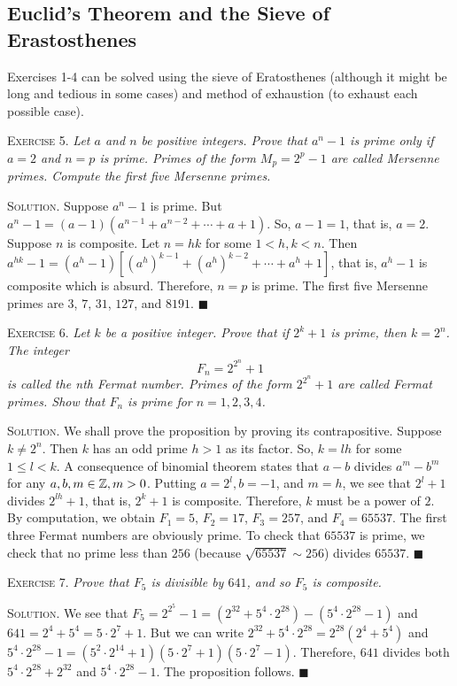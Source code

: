 \documentclass[11pt, leqno]{article}
\newcommand{\done}{\ensuremath{\blacksquare}}
\begin{document}
\subsection{Euclid's Theorem and the Sieve of Erastosthenes}

Exercises 1-4 can be solved using the sieve of Eratosthenes (although it might be long and tedious in some cases) and method of exhaustion (to exhaust each possible case).

\textsc{Exercise 5}. \emph{Let $a$ and $n$ be positive integers. Prove that $a^n-1$ is prime only if $a=2$ and $n=p$ is prime. Primes of the form $M_p = 2^p - 1$ are called Mersenne primes. Compute the first five Mersenne primes.}

\textsc{Solution}. Suppose $a^n-1$ is prime. But $a^n-1 = (a-1)(a^{n-1} + a^{n-2} + \cdots + a + 1)$. So, $a-1 = 1$, that is, $a=2$. Suppose $n$ is composite. Let $n = hk$ for some $1 < h, k < n$. Then $a^{hk}-1 = (a^h-1)[(a^h)^{k-1} + (a^h)^{k-2} + \cdots + a^h + 1]$, that is, $a^h-1$ is composite which is absurd. Therefore, $n = p$ is prime. The first five Mersenne primes are $3$, $7$, $31$, $127$, and $8191$. \done

\textsc{Exercise 6}. \emph{Let $k$ be a positive integer. Prove that if $2^k+1$ is prime, then $k= 2^n$. The integer 
\begin{displaymath}
F_n = 2^{2^n} + 1
\end{displaymath}
is called the nth Fermat number. Primes of the form $2^{2^n}+1$ are called Fermat primes. Show that $F_n$ is prime for $n=1,2,3,4$.}

\textsc{Solution}. We shall prove the proposition by proving its contrapositive. Suppose $k \ne 2^n$. Then $k$ has an odd prime $h>1$ as its factor. So, $k = lh$ for some $1\leq l < k$. A consequence of binomial theorem states that $a-b$ divides $a^m-b^m$ for any $a, b, m\in\mathbb{Z}, m>0$. Putting $a = 2^l, b = -1$, and $m = h$, we see that $2^l+1$ divides $2^{lh}+1$, that is, $2^k+1$ is composite. Therefore, $k$ must be a power of $2$. By computation, we obtain $F_1 = 5$, $F_2 = 17$, $F_3 = 257$, and $F_4 = 65537$. The first three Fermat numbers are obviously prime. To check that $65537$ is prime, we check that no prime less than $256$ (because $\sqrt{65537} \sim 256$) divides $65537$. \done

\textsc{Exercise 7}. \emph{Prove that $F_5$ is divisible by $641$, and so $F_5$ is composite.}

\textsc{Solution.} We see that $F_5 = 2^{2^5} - 1 = (2^{32} + 5^4\cdot 2^{28}) - (5^4\cdot 2^{28} - 1)$ and $641 = 2^4 + 5^4 = 5\cdot 2^7 + 1$. But we can write $2^{32} + 5^4\cdot 2^{28} = 2^{28}(2^4 + 5^4)$ and $5^4\cdot 2^{28} - 1 = (5^2\cdot 2^{14} + 1)(5\cdot 2^7 + 1)(5\cdot 2^7 - 1)$. Therefore, $641$ divides both $5^4\cdot 2^{28} + 2^{32}$ and $5^4\cdot 2^{28} - 1$. The proposition follows. \done
\end{document}
